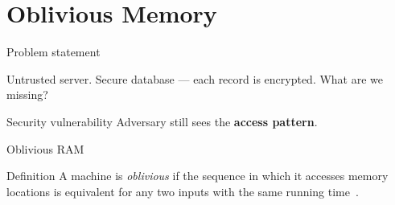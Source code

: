 
\section{Oblivious Memory}

	\begin{frame}{Problem statement}
		
		Untrusted server.
		Secure database --- each record is encrypted.
		What are we missing?

		\pause%

		\begin{alertblock}{Security vulnerability}
			Adversary still sees the \textbf{access pattern}.
		\end{alertblock}

	\end{frame}

	\begin{frame}{Oblivious RAM}

		\begin{block}{Definition}
			A machine is \emph{oblivious} if the sequence in which it accesses memory locations is equivalent for any two inputs with the same running time~\cite{Goldreich:1996:SPS:233551.233553}.
		\end{block}

	\end{frame}
